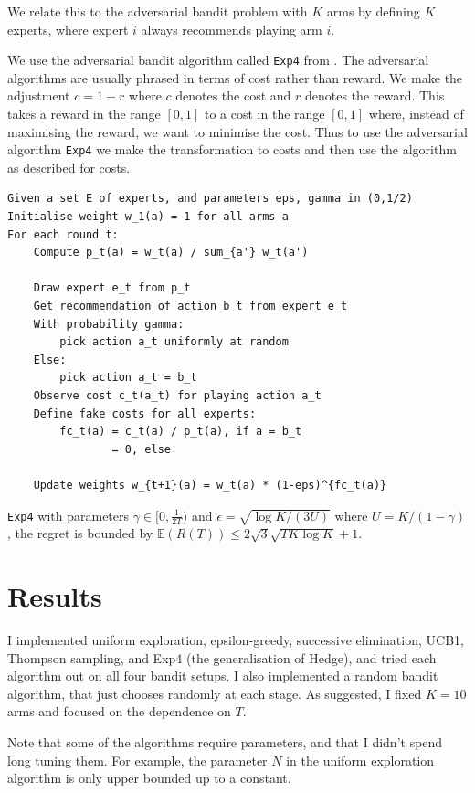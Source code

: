 \documentclass[10pt]{article}
\newcommand{\EE}{\mathbb{E}}
\begin{document}
We relate this to the adversarial bandit problem with $K$ arms by defining $K$
experts, where expert $i$ always recommends playing arm $i$.

We use the adversarial bandit algorithm called \verb'Exp4' from \cite{Slivkins}.
The adversarial algorithms are usually phrased in terms of cost rather than
reward. We make the adjustment $c = 1 - r$ where $c$ denotes the cost and $r$
denotes the reward. This takes a reward in the range $[0,1]$ to a cost in the
range $[0,1]$ where, instead of maximising the reward, we want to minimise the
cost. Thus to use the adversarial algorithm \verb'Exp4' we make the
transformation to costs and then use the algorithm as described for costs.

\begin{lstlisting}
Given a set E of experts, and parameters eps, gamma in (0,1/2)
Initialise weight w_1(a) = 1 for all arms a
For each round t:
    Compute p_t(a) = w_t(a) / sum_{a'} w_t(a')

    Draw expert e_t from p_t
    Get recommendation of action b_t from expert e_t
    With probability gamma:
        pick action a_t uniformly at random
    Else: 
        pick action a_t = b_t
    Observe cost c_t(a_t) for playing action a_t
    Define fake costs for all experts:
        fc_t(a) = c_t(a) / p_t(a), if a = b_t
                = 0, else

    Update weights w_{t+1}(a) = w_t(a) * (1-eps)^{fc_t(a)}
\end{lstlisting}

\verb'Exp4' with parameters $\gamma \in [0, \frac{1}{2T})$ and $\epsilon =
\sqrt{\log K / (3 U)}$ where $U = K / (1-\gamma)$, the regret is bounded by $\EE
(R(T)) \le 2 \sqrt{3} \sqrt{T K \log K} + 1$.

\section{Results}
I implemented uniform exploration, epsilon-greedy, successive elimination, UCB1,
Thompson sampling, and Exp4 (the generalisation of Hedge), and tried each
algorithm out on all four bandit setups. I also implemented a random bandit
algorithm, that just chooses randomly at each stage. As suggested, I fixed $K =
10$ arms and focused on the dependence on $T$.

Note that some of the algorithms require parameters, and that I didn't spend
long tuning them. For example, the parameter $N$ in the uniform exploration
algorithm is only upper bounded up to a constant.
\end{document}

